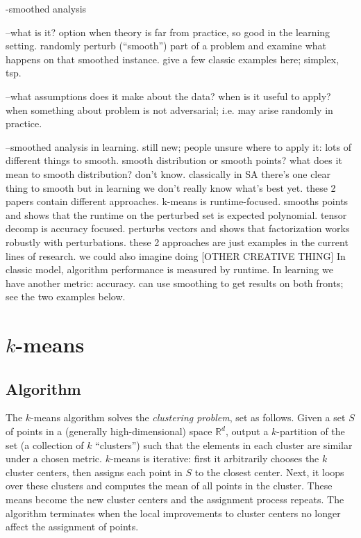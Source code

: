 -smoothed analysis

--what is it? option when theory is far from practice, so good in the
learning setting. randomly perturb (``smooth'') part of a problem and
examine what happens on that smoothed instance. give a few classic
examples here; simplex, tsp.

--what assumptions does it make about the data? when is it useful to
apply?  when something about problem is not adversarial; i.e. may
arise randomly in practice.

--smoothed analysis in learning. still new; people unsure where to
apply it: lots of different things to smooth. smooth distribution or
smooth points? what does it mean to smooth distribution? don't
know. classically in SA there's one clear thing to smooth but in
learning we don't really know what's best yet. these 2 papers contain
different approaches. k-means is runtime-focused. smooths points and
shows that the runtime on the perturbed set is expected
polynomial. tensor decomp is accuracy focused. perturbs vectors and
shows that factorization works robustly with perturbations. these 2
approaches are just examples in the current lines of research. we
could also imagine doing [OTHER CREATIVE THING] In classic model,
algorithm performance is measured by runtime. In learning we have
another metric: accuracy. can use smoothing to get results on both
fronts; see the two examples below.



\section{$k$-means}
\subsection{Algorithm}
The $k$-means algorithm solves the \emph{clustering
  problem}, set as follows. Given a set $S$ of points in a (generally
high-dimensional) space $\mathbb{R}^d$, output a $k$-partition of the
set (a collection of $k$ ``clusters'') such that the elements in each
cluster are similar under a chosen metric. $k$-means is iterative:
first it arbitrarily chooses the $k$ cluster centers, then assigns each point in $S$ to the closest center. Next, it
loops over these clusters and computes the mean of all
points in the cluster. These means become the new cluster centers and
the assignment process repeats. The algorithm terminates when the
local improvements to cluster centers no longer affect the assignment
of points.

